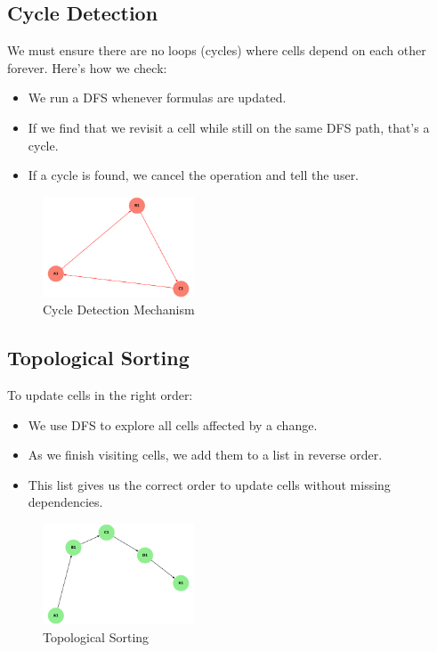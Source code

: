 \documentclass{article}
\begin{document}
\subsection{Cycle Detection}
We must ensure there are no loops (cycles) where cells depend on each other forever. Here's how we check:
\begin{itemize}
    \item We run a DFS whenever formulas are updated.
    \item If we find that we revisit a cell while still on the same DFS path, that’s a cycle.
    \item If a cycle is found, we cancel the operation and tell the user.
\end{itemize}
\begin{figure}[h]
    \centering
    \includegraphics[width=0.4\textwidth]{cycle_detection.png}
    \caption{Cycle Detection Mechanism}
\end{figure}

\subsection{Topological Sorting}
To update cells in the right order:
\begin{itemize}
    \item We use DFS to explore all cells affected by a change.
    \item As we finish visiting cells, we add them to a list in reverse order.
    \item This list gives us the correct order to update cells without missing dependencies.
\end{itemize}
\begin{figure}[h]
    \centering
    \includegraphics[width=0.4\textwidth]{topological_sorting.png}
    \caption{Topological Sorting}
\end{figure}
\end{document}
